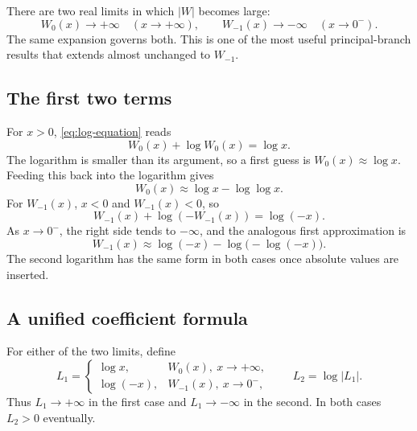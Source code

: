 \documentclass[11pt]{article}
\numberwithin{equation}{section}
\theoremstyle{definition}
\theoremstyle{remark}
\begin{document}
There are two real limits in which $|W|$ becomes large:
\[
  W_0(x)\to+\infty\quad(x\to+\infty),
  \qquad
  W_{-1}(x)\to-\infty\quad(x\to0^-).
\]
The same expansion governs both.  This is one of the most useful
principal-branch results that extends almost unchanged to $W_{-1}$.

\subsection{The first two terms}

For $x>0$, \eqref{eq:log-equation} reads
\[
 W_0(x)+\log W_0(x)=\log x.
\]
The logarithm is smaller than its argument, so a first guess is
$W_0(x)\approx\log x$.  Feeding this back into the logarithm gives
\begin{equation}
  W_0(x)\approx\log x-\log\log x.                     \label{eq:first-asymptotic-w0}
\end{equation}
For $W_{-1}(x)$, $x<0$ and $W_{-1}(x)<0$, so
\[
 W_{-1}(x)+\log(-W_{-1}(x))=\log(-x).
\]
As $x\to0^-$, the right side tends to $-\infty$, and the analogous first
approximation is
\begin{equation}
 W_{-1}(x)\approx
 \log(-x)-\log\bigl(-\log(-x)\bigr).                  \label{eq:first-asymptotic-wm1}
\end{equation}
The second logarithm has the same form in both cases once absolute values are
inserted.

\subsection{A unified coefficient formula}

For either of the two limits, define
\begin{equation}
 L_1=\begin{cases}
       \log x,&W_0(x),\ x\to+\infty,\\
       \log(-x),&W_{-1}(x),\ x\to0^- ,
     \end{cases}
 \qquad
 L_2=\log|L_1|.                                        \label{eq:L1-L2-real}
\end{equation}
Thus $L_1\to+\infty$ in the first case and $L_1\to-\infty$ in the second.
In both cases $L_2>0$ eventually.
\end{document}
